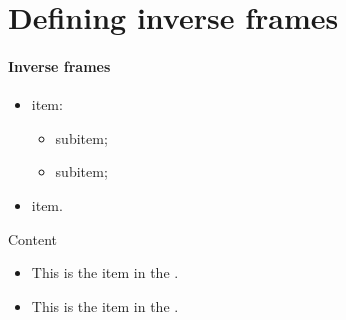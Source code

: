 \setcounter{chapter}{4}
\chapter{Defining inverse frames}

\begin{inverseframe}
\frametitle{Inverse frames}

\begin{itemize}
\item {} item:
\begin{itemize}
\normalsize
\item {} subitem;
\item {} subitem;
\end{itemize}
\item {}  item.
\end{itemize}

\begin{block}{Content}
\begin{itemize}
\item This is the  item in the .
\item This is the  item in the .
\end{itemize}
\end{block}
\end{inverseframe}
